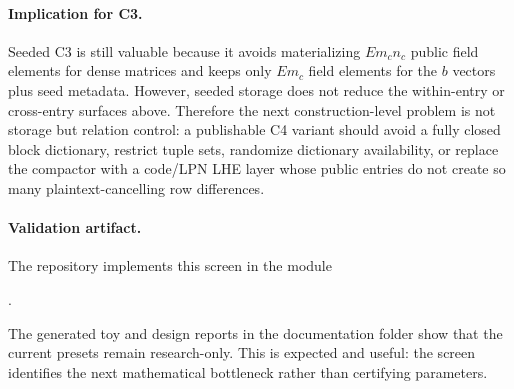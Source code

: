 \paragraph{Implication for C3.}
Seeded C3 is still valuable because it avoids materializing $E m_c n_c$ public field elements for dense matrices and keeps only $E m_c$ field elements for the $b$ vectors plus seed metadata.  However, seeded storage does not reduce the within-entry or cross-entry surfaces above.  Therefore the next construction-level problem is not storage but relation control: a publishable C4 variant should avoid a fully closed block dictionary, restrict tuple sets, randomize dictionary availability, or replace the compactor with a code/LPN LHE layer whose public entries do not create so many plaintext-cancelling row differences.

\paragraph{Validation artifact.}
The repository implements this screen in the module
\begin{center}
.
\end{center}
The generated toy and design reports in the documentation folder show that the current presets remain research-only.  This is expected and useful: the screen identifies the next mathematical bottleneck rather than certifying parameters.
